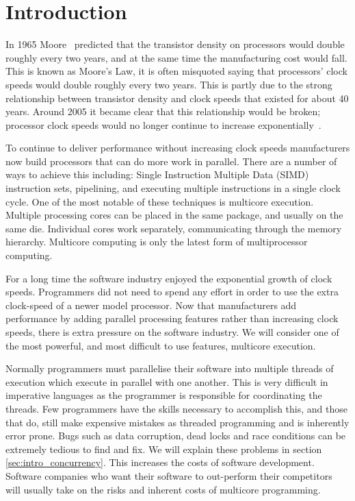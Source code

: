 %
%
\chapter{Introduction}
\label{chap:intro}

    
In 1965 Moore~\citep{moore} predicted that the transistor 
density on processors would double roughly every two years,
and at the same time the manufacturing cost would fall.
This is known as Moore's Law,
it is often misquoted saying that processors' clock speeds would double
roughly every two years.
This is partly due to the strong relationship between transistor density and
clock speeds that existed for about 40 years.
Around 2005 it became clear that this relationship would be broken;
processor clock speeds would no longer continue to increase
exponentially~\cite{free_lunch}.

To continue to deliver performance without increasing clock speeds
manufacturers now build processors that can do more work in parallel.
There are a number of ways to achieve this including:
Single Instruction Multiple Data (SIMD) instruction sets,
pipelining,
and executing multiple instructions in a single clock cycle.
One of the most notable of these techniques is multicore execution.
Multiple processing cores can be placed in the same package,
and usually on the same die.
Individual cores work separately, communicating through the memory
hierarchy.
Multicore computing is only the latest form of multiprocessor computing.

For a long time the software industry enjoyed the exponential growth of
clock speeds.
Programmers did not need to spend any effort in order to use the extra
clock-speed of a newer model processor.
Now that manufacturers add performance by adding parallel processing
features rather than increasing clock speeds,
there is extra pressure on the software industry.
We will consider one of the most powerful,
and most difficult to use features, multicore execution.

Normally programmers must parallelise their software into multiple
threads of execution which execute in parallel with one another.
This is very difficult in imperative languages as the programmer is
responsible for coordinating the threads.
Few programmers have the skills necessary to accomplish this,
and those that do, still make expensive mistakes as
threaded programming and is inherently error prone. 
Bugs such as data corruption, dead locks and race conditions
can be extremely tedious to find and fix.
We will explain these problems in section \ref{sec:intro_concurrency}.
This increases the costs of software development.
Software companies who want their software to out-perform their competitors
will usually take on the risks and inherent costs of multicore programming.

